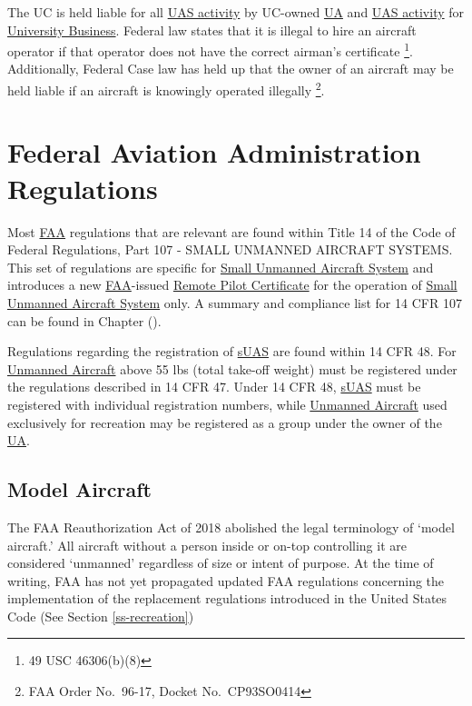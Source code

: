 \documentclass[
]{book}
\begin{document}
The UC is held liable for all \protect\hyperlink{UASactivity}{UAS activity} by UC-owned \protect\hyperlink{UA}{UA} and \protect\hyperlink{UASactivity}{UAS activity} for \protect\hyperlink{UB}{University Business}. Federal law states that it is illegal to hire an aircraft operator if that operator does not have the correct airman's certificate \footnote{49 USC 46306(b)(8)}. Additionally, Federal Case law has held up that the owner of an aircraft may be held liable if an aircraft is knowingly operated illegally \footnote{FAA Order No.~96-17, Docket No.~CP93SO0414}.

\hypertarget{federal-aviation-administration-regulations}{%
\section{Federal Aviation Administration Regulations}\label{federal-aviation-administration-regulations}}

Most \protect\hyperlink{FAA}{FAA} regulations that are relevant are found within Title 14 of the Code of Federal Regulations, Part 107 - SMALL UNMANNED AIRCRAFT SYSTEMS. This set of regulations are specific for \protect\hyperlink{sUAS}{Small Unmanned Aircraft System} and introduces a new \protect\hyperlink{FAA}{FAA}-issued \protect\hyperlink{RPC}{Remote Pilot Certificate} for the operation of \protect\hyperlink{sUAS}{Small Unmanned Aircraft System} only. A summary and compliance list for 14 CFR 107 can be found in Chapter ().

Regulations regarding the registration of \protect\hyperlink{sUAS}{sUAS} are found within 14 CFR 48. For \protect\hyperlink{UA}{Unmanned Aircraft} above 55 lbs (total take-off weight) must be registered under the regulations described in 14 CFR 47. Under 14 CFR 48, \protect\hyperlink{sUAS}{sUAS} must be registered with individual registration numbers, while \protect\hyperlink{UA}{Unmanned Aircraft} used exclusively for recreation may be registered as a group under the owner of the \protect\hyperlink{UA}{UA}.

\hypertarget{model-aircraft}{%
\subsection{Model Aircraft}\label{model-aircraft}}

The FAA Reauthorization Act of 2018 abolished the legal terminology of `model aircraft.' All aircraft without a person inside or on-top controlling it are considered `unmanned' regardless of size or intent of purpose. At the time of writing, FAA has not yet propagated updated FAA regulations concerning the implementation of the replacement regulations introduced in the United States Code (See Section \ref{ss-recreation})
\end{document}
